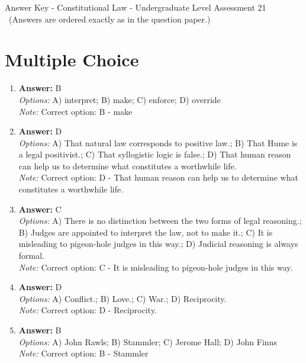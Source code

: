 \documentclass[12pt]{article}
\begin{document}
\begin{center}
Answer Key - Constitutional Law - Undergraduate Level Assessment 21 \
\small (Answers are ordered exactly as in the question paper.)
\end{center}

\section*{Multiple Choice}
\begin{enumerate}[label=\arabic*.]
\item \textbf{Answer:} B
\\ \textit{Options:} A) interpret; B) make; C) enforce; D) override
\\ \textit{Note:} Correct option: B - make
\item \textbf{Answer:} D
\\ \textit{Options:} A) That natural law corresponds to positive law.; B) That Hume is a legal positivist.; C) That syllogistic logic is false.; D) That human reason can help us to determine what constitutes a worthwhile life.
\\ \textit{Note:} Correct option: D - That human reason can help us to determine what constitutes a worthwhile life.
\item \textbf{Answer:} C
\\ \textit{Options:} A) There is no distinction between the two forms of legal reasoning.; B) Judges are appointed to interpret the law, not to make it.; C) It is misleading to pigeon-hole judges in this way.; D) Judicial reasoning is always formal.
\\ \textit{Note:} Correct option: C - It is misleading to pigeon-hole judges in this way.
\item \textbf{Answer:} D
\\ \textit{Options:} A) Conflict.; B) Love.; C) War.; D) Reciprocity.
\\ \textit{Note:} Correct option: D - Reciprocity.
\item \textbf{Answer:} B
\\ \textit{Options:} A) John Rawls; B) Stammler; C) Jerome Hall; D) John Finns
\\ \textit{Note:} Correct option: B - Stammler
\end{enumerate}
\end{document}
